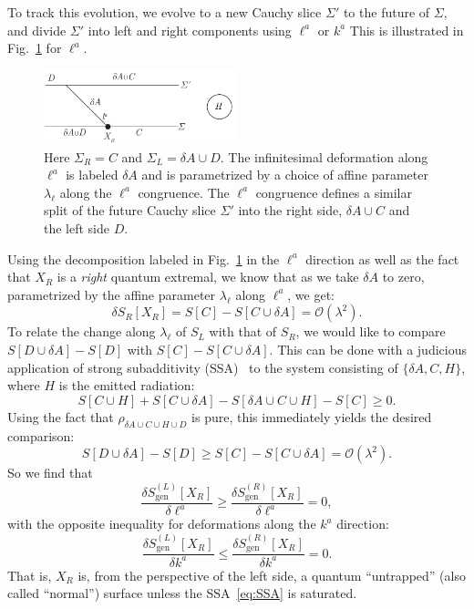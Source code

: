\documentclass[12pt]{article}
\begin{document}
To track this evolution, we evolve to a new Cauchy slice $\Sigma'$ to the future of $\Sigma$, and divide $\Sigma'$ into left and right components using $\ell^{a}$ or $k^{a}$ This is illustrated in Fig.~\ref{fig:evolution} for  $\ell^{a}$.


\begin{figure}
\center
\includegraphics[width=0.5\textwidth]{Evolution.pdf}
\caption{Here $\Sigma_{R}=C$ and $\Sigma_{L}=\delta A \cup D$. The infinitesimal deformation along $\ell^{a}$ is labeled $\delta A$ and is parametrized by a choice of affine parameter $\lambda_{\ell}$ along the $\ell^{a}$ congruence. The $\ell^{a}$ congruence defines a similar split of the future Cauchy slice $\Sigma'$ into the right side, $\delta A\cup C$ and the left side $D$. }
\label{fig:evolution}
\end{figure}


Using the decomposition labeled in Fig.~\ref{fig:evolution} in the $\ell^{a}$ direction as well as the fact that $X_{R}$ is a  \textit{right} quantum extremal, we know that as we take $\delta A$ to zero, parametrized by the affine parameter $\lambda_{\ell}$ along $\ell^{a}$, we get:
\begin{equation}
\delta S_{R}[X_{R}]=S[C]-S[C\cup \delta A] =\mathcal{O}(\lambda^{2}).
\end{equation}
To relate the change along $\lambda_{\ell}$ of $S_{L}$ with that of $S_{R}$, we would like to compare $S[D\cup \delta A]-S[D]$ with $S[C]-S[C\cup \delta A]$. This can be done with a judicious application of strong subadditivity (SSA)~\cite{LieRus73} to the system consisting of $\{\delta A, C, H\}$, where $H$ is the emitted radiation:
\begin{equation} \label{eq:SSA}
S[C \cup H]+S[C\cup \delta A] -S[\delta A\cup C\cup H]-S[C] \geq 0.
\end{equation}
Using the fact that $\rho_{\delta A \cup C \cup H \cup D}$ is pure, this immediately yields the desired comparison:
\begin{equation}
S[D\cup \delta A]-S[D]\geq S[C]-S[C\cup\delta A]=\mathcal{O}(\lambda^{2}).
\end{equation}
So we find that
\begin{equation} \frac{\delta S_{\mathrm{gen}}^{(L)}[X_{R}]}{\delta \ell^{a}}\geq \frac{\delta S_{\mathrm{gen}}^{(R)}[X_{R}]}{\delta \ell^{a}}=0,\end{equation}
with the opposite inequality for deformations along the $k^{a}$ direction:
\begin{equation} \frac{\delta S_{\mathrm{gen}}^{(L)}[X_{R}]}{\delta k^{a}}\leq \frac{\delta S_{\mathrm{gen}}^{(R)}[X_{R}]}{\delta k^{a}}=0.\end{equation}
That is, $X_{R}$ is, from the perspective of the left side, a quantum ``untrapped'' (also called ``normal'') surface unless the SSA~\eqref{eq:SSA} is saturated.
\end{document}
